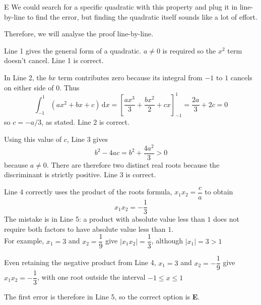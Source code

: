 \documentclass[11pt,a4paper]{article}
\begin{document}
\begin{enumerate}[label=\textbf{\arabic*.},leftmargin=*,itemsep=0pt,start=3]
\begin{djsSolution}{E}
We could search for a specific quadratic with this property and plug it in line-by-line to find the error, but finding the quadratic itself sounds like a lot of effort.

Therefore, we will analyse the proof line-by-line.

Line 1 gives the general form of a quadratic. $a\ne0$ is required so the $x^2$ term doesn't cancel. Line 1 is correct.

In Line 2, the $bx$ term contributes zero because its integral from $-1$ to $1$ cancels on either side of $0$. Thus
\[\int_{-1}^{1}(ax^2+bx+c)\,\mathrm{d}x=\left[\frac{ax^3}{3}+\frac{bx^2}{2}+cx\right]_{-1}^{1}=\frac{2a}{3}+2c=0\]
so $c=-a/3$, as stated. Line 2 is correct.

Using this value of $c$, Line 3 gives
\[b^2-4ac=b^2+\frac{4a^2}{3}>0\]
because $a\ne0$. There are therefore two distinct real roots because the discriminant is strictly positive. Line 3 is correct.

Line 4 correctly uses the product of the roots formula, $x_1x_2=\dfrac{c}{a}$ to obtain
\[x_1x_2=-\frac13\]
The mistake is in Line 5: a product with absolute value less than $1$ does not require both factors to have absolute value less than $1$. \\

For example, $x_1=3$ and $x_2=\dfrac19$ give $|x_1x_2|=\dfrac13$, although $|x_1| = 3>1$

Even retaining the negative product from Line 4, $x_1=3$ and $x_2=-\dfrac19$ give $x_1x_2=-\dfrac13$, with one root outside the interval $-1\leq x\leq1$

The first error is therefore in Line 5, so the correct option is \textbf{E}.
\end{djsSolution}
\end{enumerate}
\clearpage
\thispagestyle{djssolutions}
\vspace*{8pt}
\end{document}
